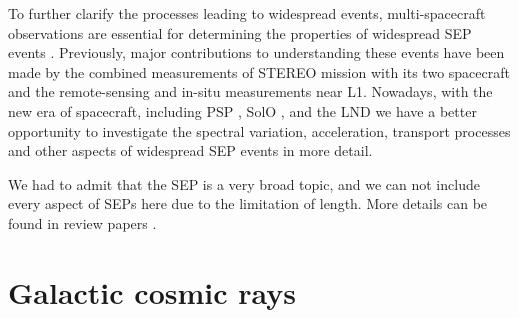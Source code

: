 To further clarify the processes leading to widespread events, multi-spacecraft observations are essential for determining the properties of widespread \ac{SEP} events \citep{Kolhoff2021AA}. Previously, major contributions to understanding these events have been made by the combined measurements of \ac{STEREO} mission with its two spacecraft and the remote-sensing and in-situ measurements near \ac{L1}. Nowadays, with the new era of spacecraft, including \acl{PSP} \citep{Fox2016SSRv}, \acl{SolO}  \citep{Mueller-2020-SolO}, and the \acl{LND} \citep{Wimmer2020SSRv} we have a better opportunity to investigate the spectral variation, acceleration, transport processes and other aspects of widespread \ac{SEP} events in more detail.


We had to admit that the \ac{SEP} is a very broad topic, and we can not include every aspect of \acp{SEP} here due to the limitation of length. More details can be found in review papers \citep{Reames2013, Desai_Diacalone2016LRSP, Reames2021LNP}.



\section{Galactic cosmic rays}

